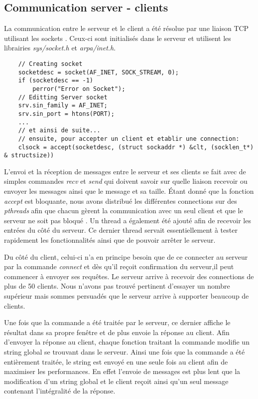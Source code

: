 \documentclass[11pt,a4paper]{article}
\begin{document}
\subsection{Communication server - clients}
La communication entre le serveur et le client a été résolue par une liaison TCP utilisant les sockets \cite{TCP}. Ceux-ci sont initialisés dans le serveur et utilisent les librairies \textit{sys/socket.h} et \textit{arpa/inet.h}.
\begin{lstlisting}
	// Creating socket
	socketdesc = socket(AF_INET, SOCK_STREAM, 0);
    if (socketdesc == -1)
        perror("Error on Socket");
    // Editting Server socket
    srv.sin_family = AF_INET;
    srv.sin_port = htons(PORT);
    ...
    // et ainsi de suite...
    // ensuite, pour accepter un client et etablir une connection:
    clsock = accept(socketdesc, (struct sockaddr *) &clt, (socklen_t*) & structsize))
\end{lstlisting}
L'envoi et la réception de messages entre le serveur et ses clients se fait avec de simples commandes \textit{recv} et \textit{send} qui doivent savoir sur quelle liaison recevoir ou envoyer les messages ainsi que le message et sa taille. Étant donné que la fonction \textit{accept} est bloquante, nous avons distribué les différentes connections sur des \textit{pthreads} afin que chacun gèrent la communication avec un seul client et que le serveur ne soit pas bloqué \cite{multiconnection}. Un thread a également été ajouté afin de recevoir les entrées du côté du serveur. Ce dernier thread servait essentiellement à tester rapidement les fonctionnalités ainsi que de pouvoir arrêter le serveur.

Du côté du client, celui-ci n'a en principe besoin que de ce connecter au serveur par la commande \textit{connect} et dès qu'il reçoit confirmation du serveur,il  peut commencer à envoyer ses requêtes. Le serveur arrive à recevoir des connections de plus de 50 clients. Nous n'avons pas trouvé pertinent d'essayer un nombre supérieur mais sommes persuadés que le serveur arrive à supporter beaucoup de clients.

Une fois que la commande a été traitée par le serveur, ce dernier affiche le résultat dans sa propre fenêtre et de plus envoie la réponse au client. Afin d'envoyer la réponse au client, chaque fonction traitant la commande modifie un string global se trouvant dans le serveur. Ainsi une fois que la commande a été entièrement traitée, le string est envoyé en une seule fois au client afin de maximiser les performances. En effet l'envoie de messages est plus lent que la modification d'un string global et le client reçoit ainsi qu'un seul message contenant l'intégralité de la réponse.
\end{document}
